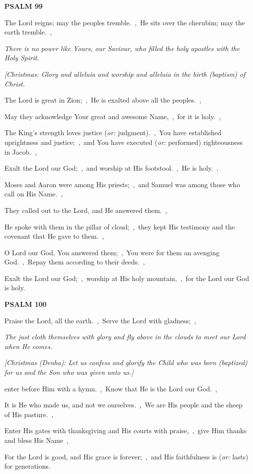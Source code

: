 \documentclass[12pt,twoside,a5paper]{article}
\newcommand{\psalm}[1]{\textbf{PSALM {#1}}\nopagebreak}
\newcommand{\qanona}[1]{{\liturgicalhint{Qanona.} \emph{#1}}}
\newcommand{\translationoption}[1]{\emph{or:} #1}
\begin{document}
\psalm{99}

\begin{normalparskip}
  The Lord reigns; may the peoples tremble.~\sep\ He sits over the cherubim; may the earth tremble.~\sep

  \qanona{There is no power like Yours, our Saviour, who filled the holy apostles with the Holy Spirit.}

  \emph{[Christmas: Glory and alleluia and worship and alleluia in the birth (baptism) of Christ.}

  The Lord is great in Zion;~\sep\ He is exalted above all the peoples.~\sep

  May they acknowledge Your great and awesome Name,~\sep\ for it is holy.~\sep

  The King's strength loves justice (\translationoption{judgment}).~\sep\ You have established uprightness and justice;~\sep\ and You have executed (\translationoption{performed}) righteousness in Jacob.~\sep

  Exalt the Lord our God;~\sep\ and worship at His footstool.~\sep\ He is holy.~\sep

  Moses and Aaron were among His priests;~\sep\ and Samuel was among those who call on His Name.~\sep

  They called out to the Lord, and He answered them.~\sep

  He spoke with them in the pillar of cloud;~\sep\ they kept His testimony and the covenant that He gave to them.~\sep

  O Lord our God, You answered them;~\sep\ You were for them an avenging God.~\sep\ Repay them according to their deeds.~\sep

  Exalt the Lord our God;~\sep\ worship at His holy mountain,~\sep\ for the Lord our God is holy.
\end{normalparskip}

\psalm{100}

\begin{normalparskip}
  Praise the Lord, all the earth.~\sep\ Serve the Lord with gladness;~\sep

  \qanona{The just cloth themselves with glory and fly above in the clouds to meet our Lord when He comes.}

  \emph{[Christmas (Denha): Let us confess and glorify the Child who was born (baptized) for us and the Son who was given unto us.]}

  enter before Him with a hymn.~\sep\ Know that He is the Lord our God.~\sep

  It is He who made us, and not we ourselves.~\sep\ We are His people and the sheep of His pasture.~\sep

  Enter His gates with thanksgiving and His courts with praise,~\sep\ give Him thanks and bless His Name~\sep

  For the Lord is good, and His grace is forever;~\sep\ and His faithfulness is (\translationoption{lasts}) for generations.
\end{normalparskip}
\end{document}
